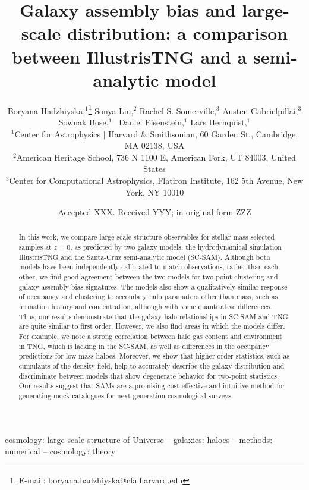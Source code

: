 \documentclass[fleqn,usenatbib]{mnras}
\title[\textsc{Galaxy distribution in IllustrisTNG and a semi-analytic model}]{Galaxy assembly bias and large-scale distribution: a comparison between IllustrisTNG and a semi-analytic model}
\author[B. Hadzhiyska et al.]{
Boryana Hadzhiyska,$^{1}$\thanks{E-mail: boryana.hadzhiyska@cfa.harvard.edu}
Sonya Liu,$^{2}$
Rachel S. Somerville,$^{3}$
Austen Gabrielpillai,$^{3}$
Sownak Bose,$^{1}$
\newauthor 
\ Daniel Eisenstein,$^{1}$
Lars Hernquist,$^{1}$
\\
$^{1}$Center for Astrophysics $\vert$ Harvard \& Smithsonian, 60 Garden St., Cambridge, MA 02138, USA\\
$^{2}$American Heritage School, 736 N 1100 E, American Fork, UT 84003, United States\\
$^{3}$Center for Computational Astrophysics, Flatiron Institute, 162 5th Avenue, New York, NY 10010
}
\date{Accepted XXX. Received YYY; in original form ZZZ}
\begin{document}
\label{firstpage}
\pagerange{\pageref{firstpage}--\pageref{lastpage}}
\maketitle

\begin{abstract}
In this work, we compare large scale structure observables for stellar mass selected samples at $z=0$, as predicted by two galaxy models, the hydrodynamical simulation IllustrisTNG and the Santa-Cruz semi-analytic model (SC-SAM). Although both models have been independently calibrated to match observations, rather than each other, we find good agreement between the two models for two-point clustering and galaxy assembly bias signatures. The models also show a qualitatively similar response of occupancy and clustering to secondary halo paramaters other than mass, such as formation history and concentration, although with some quantitative differences. Thus, our results demonstrate that the galaxy-halo relationships in SC-SAM and TNG are quite similar to first order. However, we also find areas in which the models differ. For example, we note a strong correlation between halo gas content and environment in TNG, which is lacking in the SC-SAM, as well as differences in the occupancy predictions for low-mass haloes. Moreover, we show that higher-order statistics, such as cumulants of the density field, help to accurately describe the galaxy distribution and discriminate between models that show degenerate behavior for two-point statistics. Our results suggest that SAMs are a promising cost-effective and intuitive method for generating mock catalogues for next generation cosmological surveys.

\end{abstract}

\begin{keywords}
cosmology: large-scale structure of Universe -- galaxies: haloes -- methods: numerical -- cosmology: theory
\end{keywords}


\end{document}
